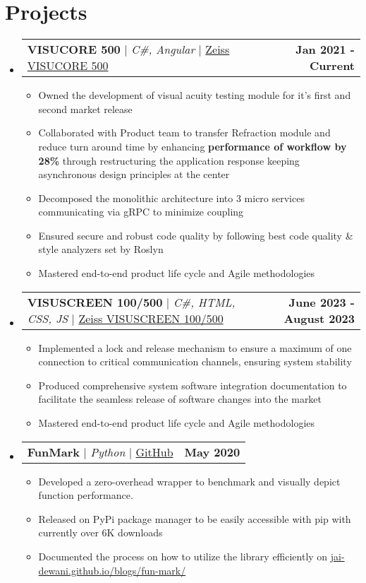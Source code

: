 \documentclass[letterpaper,11pt]{article}
\makeatletter
\newcommand{\resumeItem}[1]{
  \item\small{
    {#1 \vspace{-2pt}}
  }
}
\newcommand{\resumeProjectHeading}[2]{
    \item
    \begin{tabular*}{1.001\textwidth}{l@{\extracolsep{\fill}}r}
      \small#1 & \textbf{\small #2} \\
    \end{tabular*}\vspace{-7pt}
}
\newcommand{\resumeSubHeadingListStart}{\begin{itemize}[leftmargin=0.0in, label={}]}
\newcommand{\resumeSubHeadingListEnd}{\end{itemize}}
\newcommand{\resumeItemListStart}{\justify \begin{itemize} \vspace{-4pt}}
\newcommand{\resumeItemListEnd}{\end{itemize}\vspace{-1pt}}
\makeatother
\begin{document}
\section{Projects}
    \vspace{-2pt}
    \resumeSubHeadingListStart
        \resumeProjectHeading
            {\textbf{VISUCORE 500} $|$ \emph{C\#, Angular}  $|$ \href{https://www.zeiss.com/vision-care/int/eye-care-professionals/equipment/refraction/combined-refraction-unit.html}{Zeiss VISUCORE 500}}{Jan 2021 - Current}
            \resumeItemListStart
                \resumeItem{Owned the development of visual acuity testing module for it's first and second market release}
                \resumeItem{Collaborated with Product team to transfer Refraction module and reduce turn around time by enhancing \textbf{performance of workflow by 28\%} through restructuring the application response keeping asynchronous design principles at the center}
                \resumeItem{Decomposed the monolithic architecture into 3 micro services communicating via gRPC to minimize coupling}
                \resumeItem{Ensured secure and robust code quality by following best code quality \& style analyzers set by Roslyn}
                \resumeItem{Mastered end-to-end product life cycle and Agile methodologies}
            \resumeItemListEnd
        \resumeProjectHeading
            {\textbf{VISUSCREEN 100/500} $|$ \emph{C\#, HTML, CSS, JS}  $|$ \href{https://www.zeiss.com/vision-care/int/eye-care-professionals/equipment/refraction/subjective-refraction-unit.html}{Zeiss VISUSCREEN 100/500}}{June 2023 - August 2023}
            \resumeItemListStart
                \resumeItem{Implemented a lock and release mechanism to ensure a maximum of one connection to critical communication channels, ensuring system stability}
                \resumeItem{Produced comprehensive system software integration documentation to facilitate the seamless release of software changes into the market}
                \resumeItem{Mastered end-to-end product life cycle and Agile methodologies}
            \resumeItemListEnd
        \resumeProjectHeading
            {\textbf{FunMark} $|$ \emph{Python} $|$ \href{https://github.com/jai-dewani/fun-mark}{GitHub}}{May 2020} 
            \resumeItemListStart
                \resumeItem{Developed a zero-overhead wrapper to benchmark and visually depict function performance.}
                \resumeItem{Released on PyPi package manager to be easily accessible with pip with currently over 6K downloads}
                \resumeItem{Documented the process on how to utilize the library efficiently on \href{https://jai-dewani.github.io/blogs/fun-mark/}{jai-dewani.github.io/blogs/fun-mark/}}
            \resumeItemListEnd 
    \resumeSubHeadingListEnd
\end{document}

